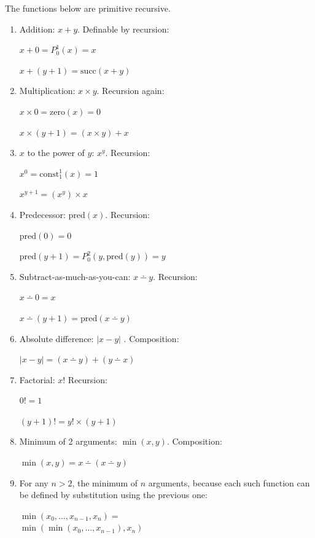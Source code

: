\documentclass[12pt]{report}
\theoremstyle{nonumberplain}
\begin{document}
\begin{mt}The functions below are primitive recursive.
\end{mt}
\begin{enumerate}[label=(\alph*)]
\item Addition: $x + y$. Definable by recursion:

$x + 0 = P^1_0(x) = x$

$x + (y + 1) = \mathrm{succ}(x + y)$

\item Multiplication: $x × y$. Recursion again:

$x × 0 = \mathrm{zero}(x) = 0$

$x × (y + 1) = (x × y) + x$

\item $x$ to the power of $y$: $x^y$. Recursion:

$x^0 = \mathrm{const}^1_1(x) = 1$

$x^{y+1} = (x^y) × x$

\item Predecessor: $\mathrm{pred}(x)$. Recursion:

$\mathrm{pred}(0) = 0$

$\mathrm{pred}(y + 1) = P^2_0(y, \mathrm{pred}(y)) = y$

\item Subtract-as-much-as-you-can: $x \dotminus y$.
 Recursion:

$x \dotminus 0 = x$

$x \dotminus (y + 1) = \mathrm{pred}(x \dotminus y)$

\item Absolute difference: $\lvert x - y \rvert$ . Composition:

$\lvert x - y\rvert  = (x \dotminus y) + (y \dotminus x)$

\item Factorial: $x!$ Recursion:

$0! = 1$

$(y + 1)! = y! × (y + 1)$

\item Minimum of 2 arguments: $\min(x, y)$.
 Composition:

$\min(x, y) = x \dotminus (x \dotminus y)$

\item For any $n > 2$, the minimum of $n$ arguments,
because each such function can be defined
by substitution using the previous one:

$\min(x_0, \dotsc , x_{n-1}, x_{n}) =$\\\phantom{a}\hfill $\min(\min(x_0, \dotsc , x_{n-1}), x_{n})$


\end{enumerate}
\end{document}
